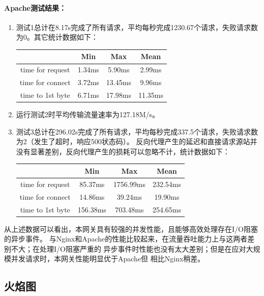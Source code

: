 \documentclass[twoside]{CUGThesis}
\begin{document}
	\paragraph{Apache测试结果：}
	\begin{enumerate}
	\item 测试1总计在8.17s完成了所有请求，平均每秒完成1230.67个请求，失败请求数为0。其它统计数据如下：
	\begin{center}
	\begin{tabular}{|c|c|c|c|} 
		\hline
		 \ & Min & Max & Mean  \\ \hline
		time for request & 1.34ms  & 5.90ms & 2.99ms \\ \hline
		time for connect & 3.72ms & 13.45ms & 9.96ms \\ \hline
		time to 1st byte & 6.71ms  & 17.98ms & 11.35ms \\
		\hline
	\end{tabular}
	\end{center}
	\item 运行测试2时平均传输流量速率为127.18M/s。
	\item 测试3总计在296.02s完成了所有请求，平均每秒完成337.5个请求，失败请求数为2（发生了超时，响应500状态码）。
	反向代理产生的延迟和直接请求源站并没有显著差别，反向代理产生的损耗可以忽略不计，统计数据如下：
	\begin{center}
		\begin{tabular}{|c|c|c|c|} 
			\hline
			 \ & Min & Max & Mean  \\ \hline
			time for request & 85.37ms  & 1756.99ms & 232.54ms \\ \hline
			time for connect & 14.86ms & 39.24ms & 19.90ms \\ \hline
			time to 1st byte & 156.38ms  & 703.48ms & 254.65ms \\
			\hline
		\end{tabular}
	\end{center}
	\end{enumerate}

	\par
	从上述数据可以看出，本网关具有较强的并发性能，且能够高效处理存在I/O阻塞的异步事件。
	与Nginx和Apache的性能比较起来，在流量吞吐能力上与这两者差别不大；在处理I/O阻塞严重的
	异步事件时性能也没有太大差别；但是在应对大规模并发请求时，本网关性能明显优于Apache但
	相比Nginx稍差。

	\subsection{火焰图}
\end{document}
